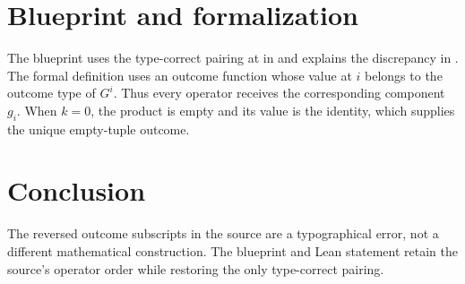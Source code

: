 \documentclass[11pt]{article}
\begin{document}
\section{Blueprint and formalization}
The blueprint uses the type-correct pairing at  in
 and explains the discrepancy
in . The formal definition
 uses an outcome function whose value at $i$ belongs
to the outcome type of $G^i$. Thus every operator receives the corresponding
component $g_i$. When $k=0$, the product is empty and its value is the identity,
which supplies the unique empty-tuple outcome.

\section{Conclusion}
The reversed outcome subscripts in the source are a typographical error, not a
different mathematical construction. The blueprint and Lean statement retain
the source's operator order while restoring the only type-correct pairing.



\end{document}
